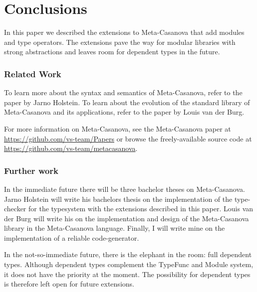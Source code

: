 \section{Conclusions}
In this paper we described the extensions to Meta-Casanova that add modules and type operators.
The extensions pave the way for modular libraries with strong abstractions and leaves room for dependent types in the future.

\subsubsection*{Related Work}
To learn more about the syntax and semantics of Meta-Casanova, refer to the paper by Jarno Holstein\cite{holstein16}.
To learn about the evolution of the standard library of Meta-Casanova and its applications, refer to the paper by Louis van der Burg\cite{vanderburg16}.

For more information on Meta-Casanova, see the Meta-Casanova paper at \url{https://github.com/vs-team/Papers} or browse the freely-available source code at \url{https://github.com/vs-team/metacasanova}.

\subsubsection*{Further work}
In the immediate future there will be three bachelor theses on Meta-Casanova.
Jarno Holstein will write his bachelors thesis on the implementation of the type-checker for the typesystem with the extensions described in this paper.
Louis van der Burg will write his on the implementation and design of the Meta-Casanova library in the Meta-Casanova language.
Finally, I will write mine on the implementation of a reliable code-generator.

In the not-so-immediate future, there is the elephant in the room: full dependent types.
Although dependent types complement the TypeFunc and Module system, it does not have the priority at the moment.
The possibility for dependent types is therefore left open for future extensions.
